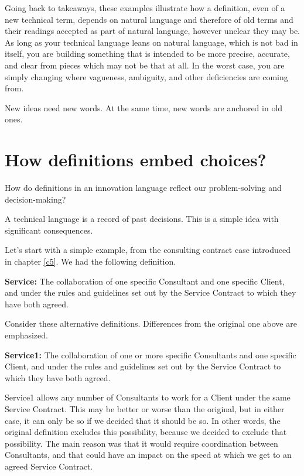 Going back to takeaways, these examples illustrate how a definition, even of a new technical term, depends on natural language and therefore of old terms and their readings accepted as part of natural language, however unclear they may be. As long as your technical language leans on natural language, which is not bad in itself, you are building something that is intended to be more precise, accurate, and clear from pieces which may not be that at all. In the worst case, you are simply changing where vagueness, ambiguity, and other deficiencies are coming from.

New ideas need new words. At the same time, new words are anchored in old ones.



\section{How definitions embed choices?}
\label{c6:s3}
How do definitions in an innovation language reflect our problem-solving and decision-making?

A technical language is a record of past decisions. This is a simple idea with significant consequences.

Let's start with a simple example, from the consulting contract case introduced in chapter \ref{c5}. We had the following definition.

\begin{svgraybox}
\textbf{Service:} The collaboration of one specific Consultant and one specific Client, and under the rules and guidelines set out by the Service Contract to which they have both agreed.
\end{svgraybox}

Consider these alternative definitions. Differences from the original one above are emphasized.

\begin{svgraybox}
\textbf{Service1:} The collaboration of one or more specific Consultants and one specific Client, and under the rules and guidelines set out by the Service Contract to which they have both agreed.
\end{svgraybox}

Service1 allows any number of Consultants to work for a Client under the same Service Contract. This may be better or worse than the original, but in either case, it can only be so if we decided that it should be so. In other words, the original definition excludes this possibility, because we decided to exclude that possibility. The main reason was that it would require coordination between Consultants, and that could have an impact on the speed at which we get to an agreed Service Contract.

